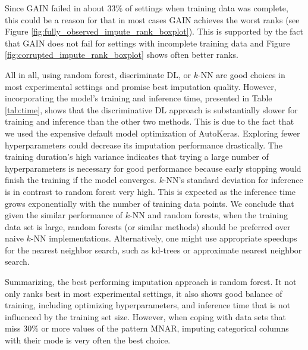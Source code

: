 Since GAIN failed in about $33\%$ of settings when training data was complete, this could be a reason for that in most cases GAIN achieves the worst ranks (see Figure \ref{fig:fully_observed_impute_rank_boxplot}). This is supported by the fact that GAIN does not fail for settings with incomplete training data and Figure \ref{fig:corrupted_impute_rank_boxplot} shows often better ranks. 

All in all, using random forest, discriminate DL, or $k$-NN are good choices in most experimental settings and promise best imputation quality. However, incorporating the model's training and inference time, presented in Table \ref{tab:time}, shows that the discriminative DL approach is substantially slower for training and inference than the other two methods. This is due to the fact that we used the expensive default model optimization of AutoKeras. Exploring fewer hyperparameters could decrease its imputation performance drastically. The training duration's high variance indicates that trying a large number of hyperparameters is necessary for good performance because early stopping would finish the training if the model converges. $k$-NN's standard deviation for inference is in contrast to random forest very high. This is expected as the inference time grows exponentially with the number of training data points. We conclude that given the similar performance of $k$-NN and random forests, when the training data set is large, random forests (or similar methods) should be preferred over naive $k$-NN implementations. Alternatively, one might use appropriate speedups for the nearest neighbor search, such as kd-trees or approximate nearest neighbor search. 

Summarizing, the best performing imputation approach is random forest. It not only ranks best in most experimental settings, it also shows good balance of training, including optimizing hyperparameters, and inference time that is not influenced by the training set size. However, when coping with data sets that miss $30\%$ or more values of the pattern MNAR, imputing categorical columns with their mode is very often the best choice.




